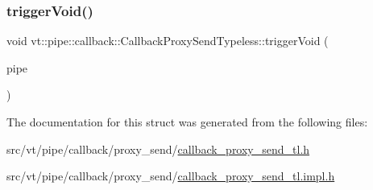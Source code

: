 \subsubsection{\texorpdfstring{trigger\+Void()}{triggerVoid()}}
{\footnotesize\ttfamily void vt\+::pipe\+::callback\+::\+Callback\+Proxy\+Send\+Typeless\+::trigger\+Void (\begin{DoxyParamCaption}\item[{\hyperlink{namespacevt_ac9852acda74d1896f48f406cd72c7bd3}{Pipe\+Type} const \&}]{pipe }\end{DoxyParamCaption})\hspace{0.3cm}{\ttfamily [inline]}}



The documentation for this struct was generated from the following files\+:\begin{DoxyCompactItemize}
\item 
src/vt/pipe/callback/proxy\+\_\+send/\hyperlink{callback__proxy__send__tl_8h}{callback\+\_\+proxy\+\_\+send\+\_\+tl.\+h}\item 
src/vt/pipe/callback/proxy\+\_\+send/\hyperlink{callback__proxy__send__tl_8impl_8h}{callback\+\_\+proxy\+\_\+send\+\_\+tl.\+impl.\+h}\end{DoxyCompactItemize}
